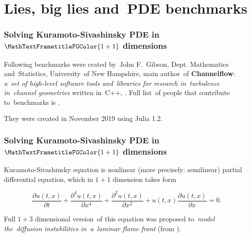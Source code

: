 \documentclass[10pt,t]{beamer}
\begin{document}
\section{Lies, big lies and~PDE benchmarks}



\begin{frame}
  \frametitle{Solving Kuramoto-Sivashinsky PDE
    in~$\MathTextFrametitleFGColor{1 + 1}$ dimensions}


  Following benchmarks were crated by~John F.~Gibson, Dept.
  Mathematics and~Statistics, University~of New Hampshire, main
  author~of \textbf{Channelflow}: \textit{a~set of high-level software
    tools and~libraries for research in~turbulence in~channel
    geometries} written in~C++, .
  Full list~of people that contribute to~benchmarks is
  .

  They were created in November 2019 using Julia 1.2.

\end{frame}





\begin{frame}
  \frametitle{Solving Kuramoto-Sivashinsky PDE
    in~$\MathTextFrametitleFGColor{1 + 1}$ dimensions}


  Kuramoto-Sivashinsky equation is nonlinear (more precisely:
  semilinear) partial differential equation, which in $1 + 1$
  dimension takes form

  \begin{equation}
    \label{eq:Julia-Proposition-01}
    \frac{ \partial u( t, x ) }{ \partial t }
    + \frac{ \partial^{ 4 } u( t, x ) }{ \partial x^{ 4 } }
    + \frac{ \partial^{ 2 } u( t, x ) }{ \partial x^{ 2 } }
    + u( t, x ) \frac{ \partial u( t, x ) }{ \partial x }
    = 0.
  \end{equation}


  Full $1 + 3$ dimensional version~of this equation was proposed
  to~\textit{model the~diffusion instabilities in~a~laminar flame
    front}
  (from
  ).

\end{frame}
\end{document}
